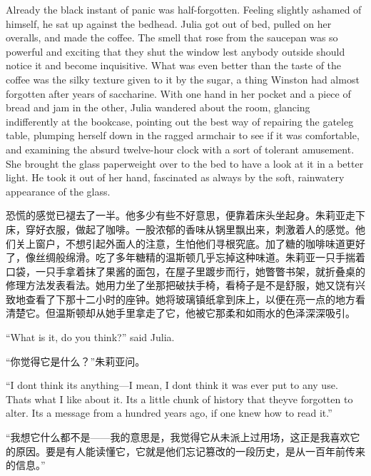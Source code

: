\begin{paracol}{2}
Already the black instant of panic was half-forgotten. Feeling slightly
ashamed of himself, he sat up against the bedhead. Julia got out of bed,
pulled on her overalls, and made the coffee. The smell that rose from
the saucepan was so powerful and exciting that they shut the window lest
anybody outside should notice it and become inquisitive. What was even
better than the taste of the coffee was the silky texture given to it by
the sugar, a thing Winston had almost forgotten after years of
saccharine. With one hand in her pocket and a piece of bread and jam in
the other, Julia wandered about the room, glancing indifferently at the
bookcase, pointing out the best way of repairing the gateleg table,
plumping herself down in the ragged armchair to see if it was
comfortable, and examining the absurd twelve-hour clock with a sort of
tolerant amusement. She brought the glass paperweight over to the bed to
have a look at it in a better light. He took it out of her hand,
fascinated as always by the soft, rainwatery appearance of the glass.

\switchcolumn

恐慌的感觉已褪去了一半。他多少有些不好意思，便靠着床头坐起身。朱莉亚走下床，穿好衣服，做起了咖啡。一股浓郁的香味从锅里飘出来，刺激着人的感觉。他们关上窗户，不想引起外面人的注意，生怕他们寻根究底。加了糖的咖啡味道更好了，像丝绸般绵滑。吃了多年糖精的温斯顿几乎忘掉这种味道。朱莉亚一只手揣着口袋，一只手拿着抹了果酱的面包，在屋子里踱步而行，她瞥瞥书架，就折叠桌的修理方法发表看法。她用力坐了坐那把破扶手椅，看椅子是不是舒服，她又饶有兴致地查看了下那十二小时的座钟。她将玻璃镇纸拿到床上，以便在亮一点的地方看清楚它。但温斯顿却从她手里拿走了它，他被它那柔和如雨水的色泽深深吸引。

\switchcolumn*

``What is it, do you think?'' said Julia.

\switchcolumn

``你觉得它是什么？''朱莉亚问。

\switchcolumn*

``I don\textquotesingle t think it\textquotesingle s anything---I mean, I
don\textquotesingle t think it was ever put to any use.
That\textquotesingle s what I like about it. It\textquotesingle s a
little chunk of history that they\textquotesingle ve forgotten to alter.
It\textquotesingle s a message from a hundred years ago, if one knew how
to read it.''

\switchcolumn

``我想它什么都不是——我的意思是，我觉得它从未派上过用场，这正是我喜欢它的原因。要是有人能读懂它，它就是他们忘记篡改的一段历史，是从一百年前传来的信息。''


\end{paracol}
